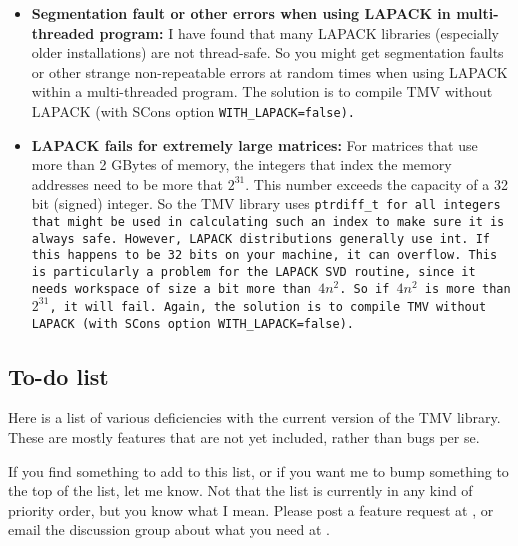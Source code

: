 \begin{itemize}
\item {\bf Segmentation fault or other errors when using LAPACK in multi-threaded program:}
I have found that many LAPACK libraries (especially older installations) 
are not thread-safe.  So you might get segmentation faults or other strange
non-repeatable errors at random times when using LAPACK within a multi-threaded
program.  The solution is to compile TMV without LAPACK (with SCons option
\tt{WITH_LAPACK=false}).

\item {\bf LAPACK fails for extremely large matrices:}
For matrices that use more than 2 GBytes of memory, the integers that index the memory addresses need to be more that $2^{31}$.  This number exceeds the capacity of a 32 bit (signed) integer.  So the TMV library uses \tt{ptrdiff_t} for all integers that might be used in calculating such an index to make sure it is always safe.  However, LAPACK distributions generally use \tt{int}.  If this happens to be 32 bits on your machine, it can overflow.  This is particularly a problem for the LAPACK SVD routine, since it needs workspace of size a bit more than $4n^2$.  So if $4n^2$ is more than $2^{31}$, it will fail.  Again, the solution is to compile TMV without LAPACK (with SCons option \tt{WITH_LAPACK=false}).

\end{itemize}

\subsection{To-do list}
\label{To_Do_List}

Here is a list of various deficiencies with the current version of the TMV library.
These are mostly features that are not yet included, rather than bugs per se.

If you find something to add to this list, or if you want me to bump something
to the top of the list, let me know.  Not that the list is currently in any kind of 
priority order, but you know what I mean.  Please post a feature request
at \myissues, or email the discussion group about what you need at \mygroup.

